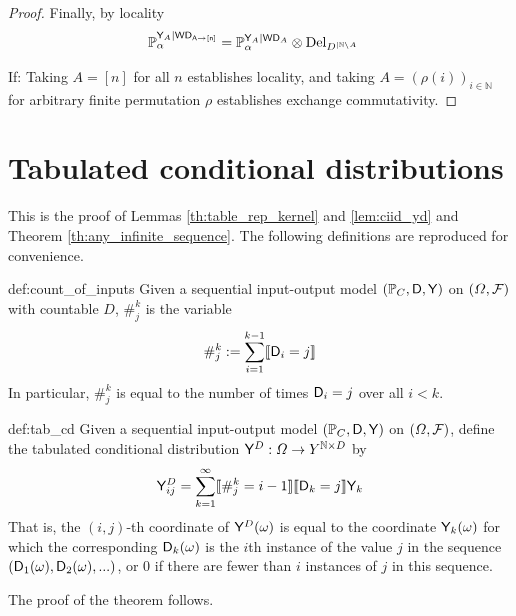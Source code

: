 \begin{proof}
Finally, by locality
\begin{align}
    \mathbb{P}_\alpha^{\mathsf{Y}_A|\mathsf{WD_{A\rightarrow [n]}}} &= \mathbb{P}_\alpha^{\mathsf{Y}_A|\mathsf{WD}_A}\otimes \text{Del}_{D^{|\mathbb{N}\setminus A}}
\end{align}

If:
Taking $A=[n]$ for all $n$ establishes locality, and taking $A=(\rho(i))_{i\in \mathbb{N}}$ for arbitrary finite permutation $\rho$ establishes exchange commutativity.
\end{proof}

\section{Tabulated conditional distributions}\label{sec:io_contract_models}

This is the proof of Lemmas \ref{th:table_rep_kernel} and \ref{lem:ciid_yd} and Theorem \ref{th:any_infinite_sequence}. The following definitions are reproduced for convenience.

\begin{repdefinition}{def:count_of_inputs}
Given a sequential input-output model $(\mathbb{P}_C,\mathsf{D},\mathsf{Y})$ on $(\Omega,\mathcal{F})$ with countable $D$, $\#_{j}^k$ is the variable
\begin{align}
    \#_{j}^k := \sum_{i=1}^{k-1} \llbracket \mathsf{D}_i = j \rrbracket
\end{align}
In particular, $\#_{j}^k$ is equal to the number of times $\mathsf{D}_i=j$ over all $i<k$.
\end{repdefinition}

\begin{repdefinition}{def:tab_cd}
Given a sequential input-output model $(\mathbb{P}_C,\mathsf{D},\mathsf{Y})$ on $(\Omega,\mathcal{F})$, define the tabulated conditional distribution $\mathsf{Y}^D:\Omega\to Y^{\mathbb{N}\times D}$ by
\begin{align}
    \mathsf{Y}^D_{ij} = \sum_{k=1}^{\infty} \llbracket \#_j^k = i-1\rrbracket \llbracket \mathsf{D}_k = j \rrbracket \mathsf{Y}_k
\end{align}
That is, the $(i,j)$-th coordinate of $\mathsf{Y}^D(\omega)$ is equal to the coordinate $\mathsf{Y}_k(\omega)$ for which the corresponding $\mathsf{D}_k(\omega)$ is the $i$th instance of the value $j$ in the sequence $(\mathsf{D}_1(\omega),\mathsf{D}_2(\omega),...)$, or 0 if there are fewer than $i$ instances of $j$ in this sequence.
\end{repdefinition}

The proof of the theorem follows.

